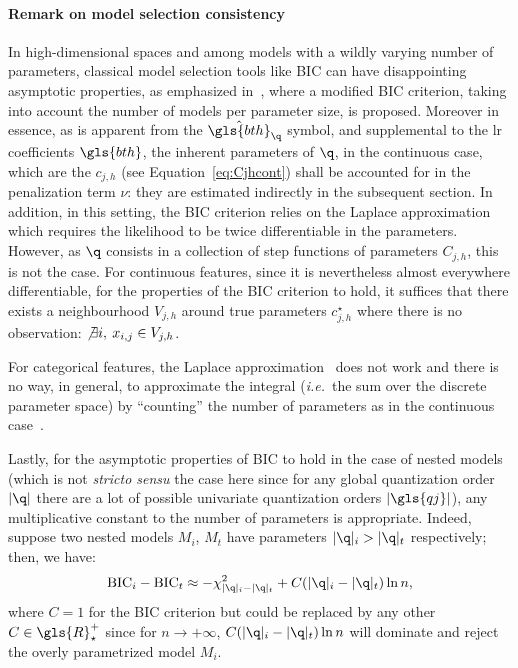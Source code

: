 \paragraph{Remark on model selection consistency} \label{par:consistency}

In high-dimensional spaces and among models with a wildly varying number of parameters, classical model selection tools like BIC can have disappointing asymptotic properties, as emphasized in~\cite{chen2008extended}, where a modified BIC criterion, taking into account the number of models per parameter size, is proposed.
Moreover in essence, as is apparent from the $\hat{\gls{bth}}_{\q}$ symbol, and supplemental to the \gls{lr} coefficients $\gls{bth}$, the inherent parameters of $\q$, in the continuous case, which are the $c_{j,h}$ (see Equation~\eqref{eq:Cjhcont}) shall be accounted for in the penalization term $\nu$: they are estimated indirectly in the subsequent section.
In addition, in this setting, the BIC criterion relies on the Laplace approximation~\cite{lebarbier} which requires the likelihood to be twice differentiable in the parameters. However, as $\q$ consists in a collection of step functions of parameters $C_{j,h}$, this is not the case. For continuous features, since it is nevertheless almost everywhere differentiable, for the properties of the BIC criterion to hold, it suffices that there exists a neighbourhood $V_{j,h}$ around true parameters $c_{j,h}^\star$ where there is no observation: $\not\exists i, \: x_{i,j} \in V_{j,h}$.

For categorical features, the Laplace approximation~\cite{lebarbier} does not work and there is no way, in general, to approximate the integral (\textit{i.e.}\ the sum over the discrete parameter space) by ``counting'' the number of parameters as in the continuous case~\cite{vincent_disc}.

Lastly, for the asymptotic properties of BIC to hold in the case of nested models (which is not \textit{stricto sensu} the case here since for any global quantization order $|\q|$ there are a lot of possible univariate quantization orders $|\gls{qj}|$), any multiplicative constant to the number of parameters is appropriate. Indeed, suppose two nested models $M_i$, $M_t$ have parameters $|\q|_i > |\q|_t$ respectively; then, we have:
\[ \text{BIC}_i - \text{BIC}_t \approx - \chi^2_{|\q|_i - |\q|_t} + C(|\q|_i - |\q|_t)\ln n, \]
where $C=1$ for the BIC criterion but could be replaced by any other $C \in \gls{R}^+_\star$ since for $n \to + \infty$, $C(|\q|_i - |\q|_t)\ln n$ will dominate and reject the overly parametrized model $M_i$.


